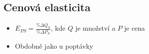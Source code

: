 \subsection{Cenová elasticita}
\begin{itemize}
    \item $E_{PS}=\frac{\% \Delta Q_S}{\% \Delta P_S}$, kde $Q$ je množství a $P$ je cena
    \item Obdobně jako u poptávky
\end{itemize}